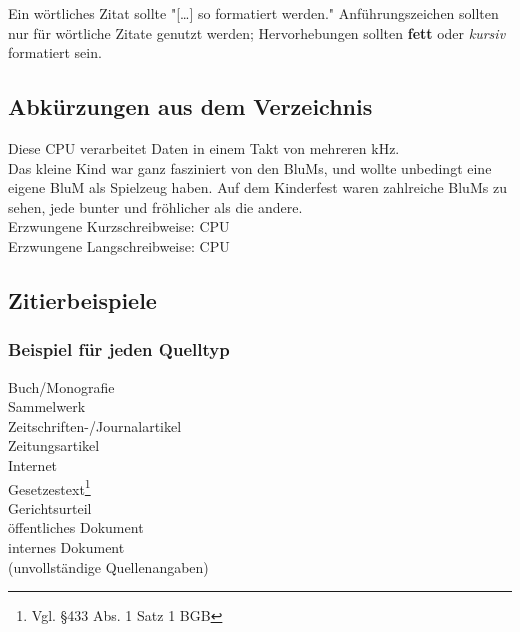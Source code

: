 Ein wörtliches Zitat sollte "[\ldots] so formatiert werden."
Anführungszeichen sollten nur für wörtliche Zitate genutzt werden; Hervorhebungen sollten \textbf{fett} oder \textit{kursiv} formatiert sein.

\subsection{Abkürzungen aus dem Verzeichnis}

Diese \ac{CPU} verarbeitet Daten in einem Takt von mehreren \ac{kHz}.\\
Das kleine Kind war ganz fasziniert von den \acp{BluM}, und wollte unbedingt eine eigene \ac{BluM} als Spielzeug haben. 
Auf dem Kinderfest waren zahlreiche \acp{BluM} zu sehen, jede bunter und fröhlicher als die andere.\\

Erzwungene Kurzschreibweise: \acs{CPU}\\
Erzwungene Langschreibweise: \acl{CPU}

\newpage
\subsection{Zitierbeispiele}
\subsubsection{Beispiel für jeden Quelltyp}%

Buch/Monografie\\
Sammelwerk\\
Zeitschriften-/Journalartikel\\
Zeitungsartikel\\
Internet\\%
Gesetzestext\footnote{Vgl. §433 Abs. 1 Satz 1 BGB}\nocite{bgb}\\
Gerichtsurteil\\
öffentliches Dokument\\
internes Dokument\\%
(unvollständige Quellenangaben)

